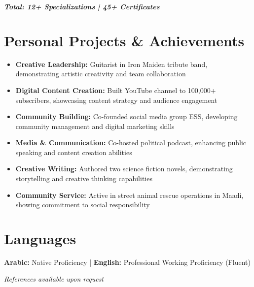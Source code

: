 \documentclass[10pt, letterpaper]{article}
\begin{document}
\begin{tcolorbox}[enhanced, frame hidden,
    left=8pt, right=8pt, top=3pt, bottom=8pt,
    colback=lightGray!20]
\begin{minipage}{0.48\textwidth}
\vspace{0.2cm}
\begin{center}
\textbf{\textcolor{accentColor}{\textit{Total: 12+ Specializations | 45+ Certificates}}}
\end{center}
\end{minipage}

\end{tcolorbox}

\section{Personal Projects \& Achievements}
\begin{itemize}[leftmargin=*, itemsep=0.4ex]
    \item \textbf{Creative Leadership:} Guitarist in Iron Maiden tribute band, demonstrating artistic creativity and team collaboration
    \item \textbf{Digital Content Creation:} Built YouTube channel to 100,000+ subscribers, showcasing content strategy and audience engagement
    \item \textbf{Community Building:} Co-founded social media group ESS, developing community management and digital marketing skills
    \item \textbf{Media \& Communication:} Co-hosted political podcast, enhancing public speaking and content creation abilities
    \item \textbf{Creative Writing:} Authored two science fiction novels, demonstrating storytelling and creative thinking capabilities
    \item \textbf{Community Service:} Active in street animal rescue operations in Maadi, showing commitment to social responsibility
\end{itemize}

\section{Languages}
\textbf{Arabic:} Native Proficiency | \textbf{English:} Professional Working Proficiency (Fluent)

\vfill
\begin{center}
    \textcolor{primaryColor}{\textit{References available upon request}}
\end{center}
\end{document}
